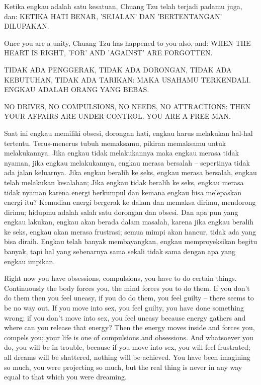 \bahasa
Ketika engkau adalah satu kesatuan, Chuang Tzu telah terjadi padamu juga, dan: KETIKA HATI BENAR, 'SEJALAN' DAN 'BERTENTANGAN' DILUPAKAN.

\english
Once you are a unity, Chuang Tzu has happened to you also, and: WHEN THE HEART IS RIGHT, 'FOR' AND 'AGAINST' ARE FORGOTTEN.

\bahasa
TIDAK ADA PENGGERAK, TIDAK ADA DORONGAN, TIDAK ADA KEBUTUHAN, TIDAK ADA TARIKAN: MAKA USAHAMU TERKENDALI. ENGKAU ADALAH ORANG YANG BEBAS.

\english
NO DRIVES, NO COMPULSIONS, NO NEEDS, NO ATTRACTIONS: THEN YOUR AFFAIRS ARE UNDER CONTROL. YOU ARE A FREE MAN.

\bahasa
Saat ini engkau memiliki obsesi, dorongan hati, engkau harus melakukan hal-hal tertentu. Terus-menerus tubuh memaksamu, pikiran memaksamu untuk melakukannya. Jika engkau tidak melakukannya maka engkau merasa tidak nyaman, jika engkau melakukannya, engkau merasa bersalah -- sepertinya tidak ada jalan keluarnya. Jika engkau beralih ke seks, engkau merasa bersalah, engkau telah melakukan kesalahan; Jika engkau tidak beralih ke seks, engkau merasa tidak nyaman karena energi berkumpul dan kemana engkau bisa melepaskan energi itu? Kemudian energi bergerak ke dalam dan memaksa dirimu, mendorong dirimu; hidupmu adalah salah satu dorongan dan obsesi. Dan apa pun yang engkau lakukan, engkau akan berada dalam masalah, karena jika engkau beralih ke seks, engkau akan merasa frustrasi; semua mimpi akan hancur, tidak ada yang bisa diraih. Engkau telah banyak membayangkan, engkau memproyeksikan begitu banyak, tapi hal yang sebenarnya sama sekali tidak sama dengan apa yang engkau impikan.

\english
Right now you have obsessions, compulsions, you have to do certain things. Continuously the body forces you, the mind forces you to do them. If you don't do them then you feel uneasy, if you do do them, you feel guilty -- there seems to be no way out. If you move into sex, you feel guilty, you have done something wrong; if you don't move into sex, you feel uneasy because energy gathers and where can you release that energy? Then the energy moves inside and forces you, compels you; your life is one of compulsions and obsessions. And whatsoever you do, you will be in trouble, because if you move into sex, you will feel frustrated; all dreams will be shattered, nothing will be achieved. You have been imagining so much, you were projecting so much, but the real thing is never in any way equal to that which you were dreaming.


